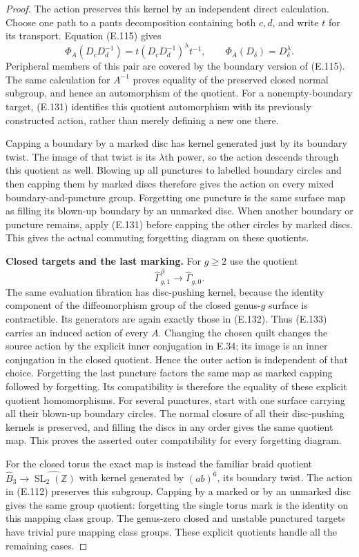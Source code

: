 \begin{proof}
The action preserves this kernel
by an independent direct
calculation.  Choose one path
to a pants decomposition
containing both $c,d$, and
write $t$ for its transport.
Equation (E.115) gives
\[
 \Phi_A(D_cD_d^{-1})
     =t(D_cD_d^{-1})^\lambda t^{-1},
 \qquad
 \Phi_A(D_\delta)=D_\delta^\lambda .
                                                               \tag{E.132}
\]
Peripheral members of this pair
are covered by the boundary
version of (E.115).
The same calculation for
$A^{-1}$ proves equality of
the preserved closed normal
subgroup, and hence an
automorphism of the quotient.
For a nonempty-boundary target,
(E.131) identifies this quotient
automorphism with its previously
constructed action, rather than
merely defining a new one there.

Capping a boundary by a marked
disc has kernel generated just
by its boundary twist.  The
image of that twist is its
$\lambda$th power, so the
action descends through this
quotient as well.  Blowing up
all punctures to labelled
boundary circles and then
capping them by marked discs
therefore gives the action on
every mixed boundary-and-puncture
group.  Forgetting one puncture
is the same surface map as
filling its blown-up boundary
by an unmarked disc.
When another boundary or
puncture remains, apply
(E.131) before capping the
other circles by marked discs.
This gives the actual commuting
forgetting diagram on these
quotients.

\medskip\noindent\textbf{Closed targets and the last marking.}
For $g\geq2$ use the quotient
\[
 \widehat\Gamma_{g,1}^{\partial}
       \longrightarrow\widehat\Gamma_{g,0}.             \tag{E.133}
\]
The same evaluation fibration
has disc-pushing kernel, because
the identity component of the
diffeomorphism group of the
closed genus-$g$ surface is
contractible.  Its generators
are again exactly those in
(E.132).  Thus (E.133) carries
an induced action of every
$A$.  Changing the chosen
quilt changes the source action
by the explicit inner
conjugation in E.34; its image
is an inner conjugation in the
closed quotient.  Hence the
outer action is independent of
that choice.
Forgetting the last puncture
factors the same map as marked
capping followed by forgetting.
Its compatibility is therefore
the equality of these explicit
quotient homomorphisms.
For several punctures, start
with one surface carrying all
their blown-up boundary circles.
The normal closure of all their
disc-pushing kernels is
preserved, and filling the
discs in any order gives the
same quotient map.  This
proves the asserted outer
compatibility for every
forgetting diagram.

For the closed torus the
exact map is instead the
familiar braid quotient
$\widehat B_3\to
\widehat{\operatorname{SL}_2(\mathbb Z)}$
with kernel generated by
$(ab)^6$, its boundary twist.
The action in (E.112)
preserves this subgroup.
Capping by a marked or by an
unmarked disc gives the same
group quotient: forgetting
the single torus mark is the
identity on this mapping class
group.  The genus-zero closed
and unstable punctured targets
have trivial pure mapping
class groups.  These explicit
quotients handle all the
remaining cases.
\end{proof}

